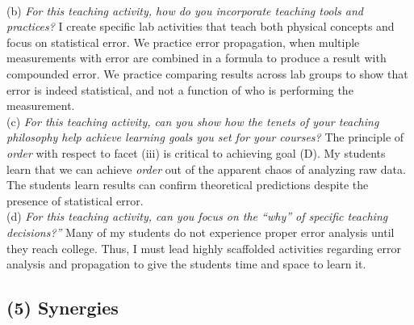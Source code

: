 \documentclass[../../../main.tex]{subfiles}
\begin{document}
\\
\vspace{0.15cm}
(b) \textit{For this teaching activity, how do you incorporate teaching tools and practices?}  I create specific lab activities that teach both physical concepts and focus on statistical error.  We practice error propagation, when multiple measurements with error are combined in a formula to produce a result with compounded error.  We practice comparing results across lab groups to show that error is indeed statistical, and not a function of who is performing the measurement.
\\
\vspace{0.15cm}
(c) \textit{For this teaching activity, can you show how the tenets of your teaching philosophy help achieve learning goals you set for your courses?}  The principle of \textit{order} with respect to facet (iii) is critical to achieving goal (D).  My students learn that we can achieve \textit{order} out of the apparent chaos of analyzing raw data.  The students learn results can confirm theoretical predictions despite the presence of statistical error.
\\
\vspace{0.15cm}
(d) \textit{For this teaching activity, can you focus on the ``why'' of specific teaching decisions?''} Many of my students do not experience proper error analysis until they reach college.  Thus, I must lead highly scaffolded activities regarding error analysis and propagation to give the students time and space to learn it.

\subsection{(5) Synergies}
\end{document}
